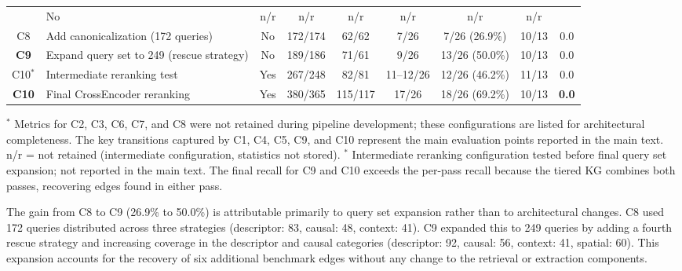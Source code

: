 \documentclass[10pt]{article}
\begin{document}
\begin{table}[htb]
\begin{tabular}{clccccccc}
  & No & n/r & n/r & n/r & n/r & n/r & n/r \\
C8
  & Add canonicalization (172 queries)
  & No & 172/174 & 62/62 & 7/26 & 7/26 (26.9\%) & 10/13 & 0.0 \\
\textbf{C9}
  & Expand query set to 249 (rescue strategy)
  & No & 189/186 & 71/61 & 9/26 & 13/26 (50.0\%) & 10/13 & 0.0 \\
C10$^*$
  & Intermediate reranking test
  & Yes & 267/248 & 82/81 & 11--12/26 & 12/26 (46.2\%) & 11/13 & 0.0 \\
\textbf{C10}
  & Final CrossEncoder reranking
  & Yes & 380/365 & 115/117 & 17/26 & 18/26 (69.2\%) & 10/13 & \textbf{0.0} \\
\bottomrule
\end{tabular}
\noindent\small$^*$ Metrics for C2, C3, C6, C7, and
C8 were not retained during pipeline development;
these configurations are listed for architectural
completeness. The key transitions captured by C1,
C4, C5, C9, and C10 represent the main evaluation
points reported in the main text.
\medskip
\noindent\small
n/r = not retained (intermediate configuration,
statistics not stored).
$^*$ Intermediate reranking configuration tested
before final query set expansion; not reported in
the main text.
The final recall for C9 and C10 exceeds the
per-pass recall because the tiered KG combines
both passes, recovering edges found in either pass.
\end{table}

The gain from C8 to C9 (26.9\% to 50.0\%) is
attributable primarily to query set expansion
rather than to architectural changes.
C8 used 172 queries distributed across three
strategies (descriptor: 83, causal: 48,
context: 41).
C9 expanded this to 249 queries by adding a
fourth rescue strategy and increasing coverage
in the descriptor and causal categories
(descriptor: 92, causal: 56, context: 41,
spatial: 60).
This expansion accounts for the recovery of six
additional benchmark edges without any change to
the retrieval or extraction components.
\end{document}
